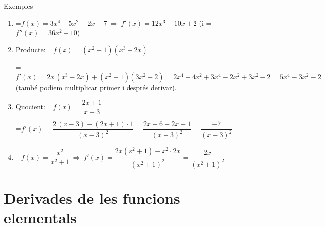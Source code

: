 \documentclass[11pt,a4paper]{article}
\newcommand{\fmm}[1]{\setbox0=\hbox{$#1$}\ifdim\wd0>\linewidth\[#1\]\else\mbox{\box0}\fi}
\begin{document}
  
\begin{fmex}{Exemples}
\begin{enumerate}[label=\textbf{\arabic*.},leftmargin=*]
\item \fmm{f(x)=3x^4-5x^2+2x-7\ \Rightarrow\ f'(x)=12x^3-10x+2} (i \fmm{f''(x)=36x^2-10})

\vspace*{0.2cm}

\item Producte: \fmm{f(x)=(x^2+1)(x^3-2x)}
          
\vspace*{0.2cm}
            

\fmm{f'(x)=2x\,(x^3-2x)+(x^2+1)(3x^2-2)=2x^4-4x^2+3x^4-2x^2+3x^2-2=5x^4-3x^2-2}\\
 (també podíem multiplicar primer i després derivar).\\
 
\item Quocient: \fmm{f(x)=\dfrac{2x+1}{x-3}}
          
\vspace*{0.2cm}
            

\fmm{f'(x)=\dfrac{2\,(x-3)-(2x+1)\cdot1}{(x-3)^2}=\dfrac{2x-6-2x-1}{(x-3)^2}=\dfrac{-7}{(x-3)^2}}\\

\item \fmm{f(x)=\dfrac{x^2}{x^2+1}\ \Rightarrow\ f'(x)=\dfrac{2x(x^2+1)-x^2\cdot2x}{(x^2+1)^2}=\dfrac{2x}{(x^2+1)^2}}
\end{enumerate}
\end{fmex}

  
\section{Derivades de les funcions elementals}\hypertarget{sec5}{}

  
\end{document}
